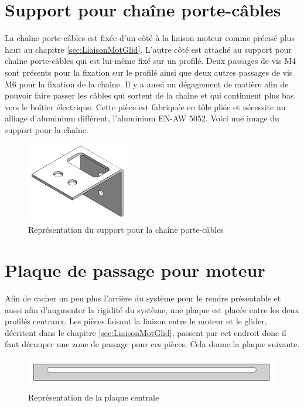 \section{Support pour chaîne porte-câbles}\label{sec:SupChainCable}
La chaîne porte-câbles est fixée d'un côté à la liaison moteur comme précisé plus haut au chapitre \ref{sec:LiaisonMotGlid}. L'autre côté est
attaché au support pour chaîne porte-câbles qui est lui-même fixé sur un profilé. Deux passages de vis M4 sont présents pour la fixation sur
le profilé ainsi que deux autres passages de vis M6 pour la fixation de la chaîne. Il y a aussi un dégagement de matière afin de pouvoir faire
passer les câbles qui sortent de la chaîne et qui continuent plus bas vers le boîtier électrique. Cette pièce est fabriquée en tôle pliée et
nécessite un alliage d'aluminium différent, l'aluminium EN-AW 5052. Voici une image du support pour la chaîne.

\begin{figure}[H]
  \centering
  \includegraphics[width = 0.4\textwidth]{assets/figures/SupportChaineCable.png}
  \caption{Représentation du support pour la chaîne porte-câbles}
  \label{fig:SupChaineCable}
\end{figure}

\section{Plaque de passage pour moteur}\label{sec:PlaPassMot}
Afin de cacher un peu plus l'arrière du système pour le rendre présentable et aussi afin d'augmenter la rigidité du système, une plaque est placée
entre les deux profilés centraux. Les pièces faisant la liaison entre le moteur et le glider, décritent dans le chapitre \ref{sec:LiaisonMotGlid},
passent par cet endroit donc il faut découper une zone de passage pour ces pièces. Cela donne la plaque suivante.

\begin{figure}[H]
  \centering
  \includegraphics[width = \textwidth]{assets/figures/PlaquePassageMoteur.png}
  \caption{Représentation de la plaque centrale}
  \label{fig:PLaPassMot}
\end{figure}

